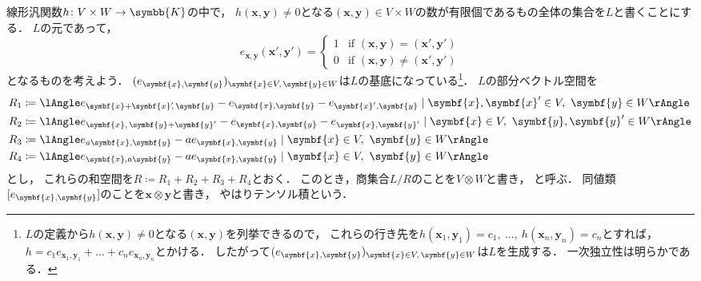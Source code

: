 \documentclass[../sotsu.tex]{subfiles}
\begin{document}
\begin{definition}
    \label{dfn:tensor-product}
    線形汎関数$h \colon V \times W \to \symbb{K}$の中で，
    $h(\symbf{x}, \symbf{y}) \neq 0$となる$(\symbf{x}, \symbf{y}) \in V \times W$の数が有限個であるもの全体の集合を$L$と書くことにする．
    $L$の元であって，
    \begin{equation*}
        e_{\symbf{x}, \symbf{y}} (\symbf{x}', \symbf{y}') = 
        \begin{cases}
            1  &  \text{if } (\symbf{x}, \symbf{y}) = (\symbf{x}', \symbf{y}')  \\
            0  &  \text{if } (\symbf{x}, \symbf{y}) \neq (\symbf{x}', \symbf{y}')
        \end{cases}
    \end{equation*}
    となるものを考えよう．
    $\sequ{e_{\symbf{x}, \symbf{y}}}[\symbf{x} \in V, \, \symbf{y} \in W]$は$L$の基底になっている\footnote{
        $L$の定義から$h(\symbf{x}, \symbf{y}) \neq 0$となる$(\symbf{x}, \symbf{y})$を列挙できるので，
        これらの行き先を$h(\symbf{x}_1, \symbf{y}_1) = c_1, \  \dots, \  h(\symbf{x}_n, \symbf{y}_n) = c_n$とすれば，
        $h = c_1 e_{\symbf{x}_1, \symbf{y}_1} + \dots + c_n e_{\symbf{x}_n, \symbf{y}_n}$とかける．
        したがって$\sequ{e_{\symbf{x}, \symbf{y}}}[\symbf{x} \in V, \, \symbf{y} \in W]$は$L$を生成する．
        一次独立性は明らかである．
    }．
    $L$の部分ベクトル空間を
    \begin{align*}
        R_1 &\coloneq \spanning{ e_{\symbf{x} + \symbf{x}^{\mathrlap{\prime}}, \, \symbf{y}} - e_{\symbf{x}, \symbf{y}} - e_{\symbf{x}', \symbf{y}} \mid \symbf{x}, \symbf{x}' \in V, \  \symbf{y} \in W }  \\
        R_2 &\coloneq \spanning{ e_{\symbf{x}, \, \symbf{y} + \symbf{y}'} - e_{\symbf{x}, \symbf{y}} - e_{\symbf{x}, \symbf{y}'} \mid \symbf{x} \in V, \  \symbf{y}, \symbf{y}' \in W }  \\
        R_3 &\coloneq \spanning{ e_{a\symbf{x}, \symbf{y}} - a e_{\symbf{x}, \symbf{y}} \mid \symbf{x} \in V, \  \symbf{y} \in W }  \\
        R_4 &\coloneq \spanning{ e_{\symbf{x}, a\symbf{y}} - a e_{\symbf{x}, \symbf{y}} \mid \symbf{x} \in V, \  \symbf{y} \in W }
    \end{align*}
    とし，
    これらの和空間を$R \coloneq R_1 + R_2 + R_3 + R_4$とおく．
    このとき，商集合$L/R$のことを$V \otimes W$と書き，
    と呼ぶ．
    同値類$\eqclass{e_{\symbf{x}, \symbf{y}}}$のことを$\symbf{x} \otimes \symbf{y}$と書き，
    やはりテンソル積という．
\end{definition}
\end{document}
